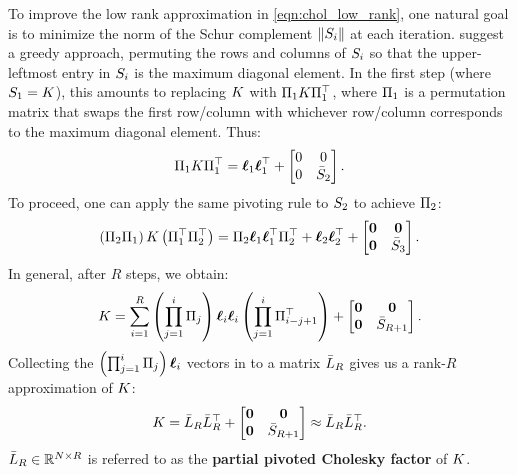 To improve the low rank approximation in \cref{eqn:chol_low_rank}, one natural goal is to minimize the norm of the Schur complement $\Vert S_{i} \Vert$ at each iteration.
\citet{harbrecht2012low} suggest a greedy approach, permuting the rows and columns of $S_{i}$ so that the upper-leftmost entry in $S_{i}$ is the maximum diagonal element.
In the first step (where $S_1 = K$), this amounts to replacing $K$ with $\Pi_{1} K \Pi_{1}^\top$, where $\Pi_{1}$ is a permutation matrix that swaps the first row/column with whichever row/column corresponds to the maximum diagonal element.
Thus:
%
\begin{align*}
  \Pi_{1} K \Pi_{1}^\top = \boldsymbol{\ell}_{1}\boldsymbol{\ell}_{1}^{\top} + \begin{bmatrix} 0 & 0 \\ 0 & \bar {S}_2 \end{bmatrix}.
\end{align*}
%
To proceed, one can apply the same pivoting rule to $S_2$ to achieve $\Pi_{2}$:
%
\begin{align*}
  \left( \Pi_{2} \Pi_{1} \right) K \left( \Pi_{1}^\top \Pi_{2}^\top \right) = \Pi_{2} \boldsymbol{\ell}_{1}\boldsymbol{\ell}_{1}^{\top} \Pi_2^\top
  + \boldsymbol{\ell}_2 \boldsymbol{\ell}_2^\top + \begin{bmatrix} \mathbf{0} & \mathbf{0} \\ \mathbf{0} & \bar {S}_3 \end{bmatrix}.
\end{align*}
%
In general, after $R$ steps, we obtain:
\begin{align}
  K = \sum_{i=1}^{R} \left( \prod_{j=1}^i \Pi_j \right) {\boldsymbol{\ell}}_{i} {\boldsymbol{\ell}}_{i} \left( \prod_{j=1}^i \Pi_{i-j+1}^\top \right)
  + \begin{bmatrix} \mathbf{0} & \mathbf{0} \\ \mathbf{0} & \bar {S}_{R+1} \end{bmatrix}.
\end{align}
Collecting the $\left( \prod_{j=1}^i \Pi_j \right) {\boldsymbol{\ell}}_{i}$ vectors in to a matrix $\bar{L}_R$ gives us a rank-$R$ approximation of $K$:
%
\begin{equation}
  K = \bar{L}_{R} \bar{L}_{R}^{\top} + \begin{bmatrix} \mathbf{0} & \mathbf{0} \\ \mathbf{0} & \bar {S}_{R+1} \end{bmatrix} \approx \bar{L}_{R} \bar{L}_{R}^{\top}.
  \label{eqn:chol_error}
\end{equation}
%
$\bar{L}_{R} \in \mathbb{R}^{N \times R}$ is referred to as the {\bf partial pivoted Cholesky factor} of $K$.


